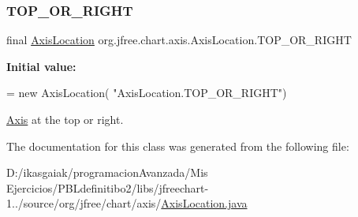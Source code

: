 \subsubsection{\texorpdfstring{T\+O\+P\+\_\+\+O\+R\+\_\+\+R\+I\+G\+HT}{TOP\_OR\_RIGHT}}
{\footnotesize\ttfamily final \mbox{\hyperlink{classorg_1_1jfree_1_1chart_1_1axis_1_1_axis_location}{Axis\+Location}} org.\+jfree.\+chart.\+axis.\+Axis\+Location.\+T\+O\+P\+\_\+\+O\+R\+\_\+\+R\+I\+G\+HT\hspace{0.3cm}{\ttfamily [static]}}

{\bfseries Initial value\+:}
\begin{DoxyCode}
= \textcolor{keyword}{new} AxisLocation(
            \textcolor{stringliteral}{"AxisLocation.TOP\_OR\_RIGHT"})
\end{DoxyCode}
\mbox{\hyperlink{classorg_1_1jfree_1_1chart_1_1axis_1_1_axis}{Axis}} at the top or right. 

The documentation for this class was generated from the following file\+:\begin{DoxyCompactItemize}
\item 
D\+:/ikasgaiak/programacion\+Avanzada/\+Mis Ejercicios/\+P\+B\+Ldefinitibo2/libs/jfreechart-\/1../source/org/jfree/chart/axis/\mbox{\hyperlink{_axis_location_8java}{Axis\+Location.\+java}}\end{DoxyCompactItemize}
